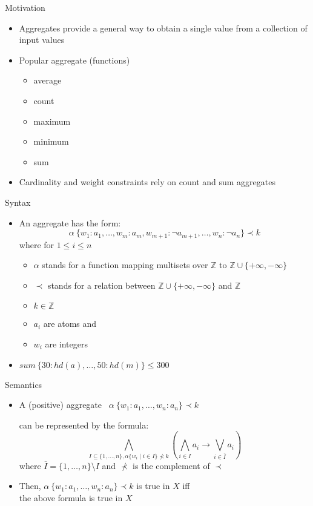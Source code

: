 \begin{frame}{Motivation}
  \begin{itemize}
  \item Aggregates provide a general way to obtain a single value from a
    collection of input values
  \item Popular aggregate (functions)
    \begin{itemize}
    \item average
    \item count
    \item maximum
    \item minimum
    \item sum
    \end{itemize}
  \item Cardinality and weight constraints rely on count and sum aggregates
  \end{itemize}
\end{frame}
\begin{frame}{Syntax}
  \begin{itemize}
  \item
    An \alert{aggregate} has the form:
    \[
    \alpha~\{ w_1:a_1,\dots,w_m:a_m,w_{m+1}:{\neg a_{m+1}},\dots,w_n:{\neg a_n} \} \prec k
    \]
    where for $1 \leq i \leq n$
    \begin{itemize}
    \item $\alpha$ stands for a function mapping multisets over $\mathbb{Z}$ to $\mathbb{Z} \cup \{+\infty, -\infty\}$
    \item $\prec$ stands for a relation between $\mathbb{Z}\cup\{+\infty, -\infty\}$ and $\mathbb{Z}$
    \item $k\in\mathbb{Z}$
    \item $a_i$ are atoms  and
    \item $w_i$ are integers
    \end{itemize}
  \item {}
    \(
    \mathit{sum}~\{ 30:hd(a),\dots,50:hd(m) \} \leq 300
    \)
  \end{itemize}
\end{frame}
\begin{frame}{Semantics}
  \begin{itemize}
  \item
    A (positive) aggregate \ $\alpha~\{ w_1:a_1, \dots, w_n:a_n \} \prec k$
    \par
    can be represented by the formula:
    \[
    \bigwedge_{I \subseteq \{1,\dots,n\}, \alpha \{ w_i \mid i \in I \} \not \prec k}
    \left(
      \bigwedge_{i \in I} a_i \rightarrow \bigvee_{i \in \overline{I}} a_i
    \right)
    \]
    where $\overline{I} = \{1,\dots,n\}\setminus I$ and $\not\prec$ is the
    complement of $\prec$

  \item Then,
    $\alpha~\{ w_1:a_1, \dots, w_n:a_n \} \prec k$ is true in $X$
    iff\\
    the above formula is true in $X$
  \end{itemize}
\end{frame}
